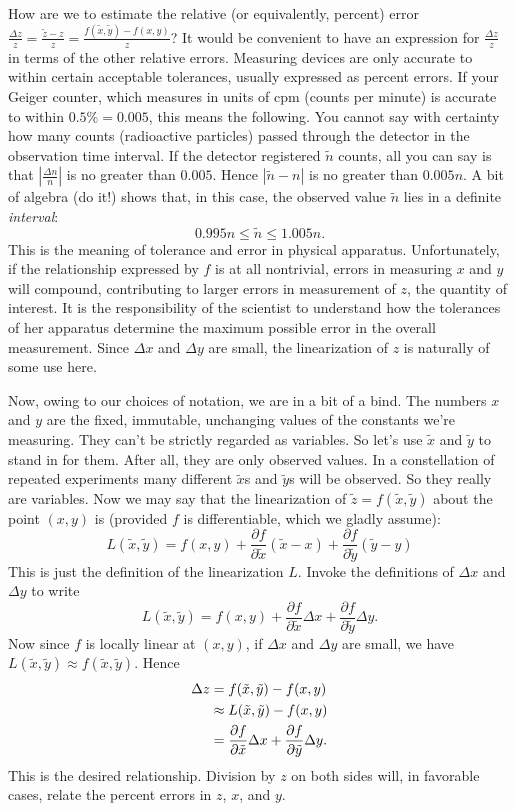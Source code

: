 \documentclass[11pt]{amsart}
\begin{document}
How are we to estimate the relative (or equivalently, percent) error $\frac{\Delta z}{z} = \frac{\tilde{z} - z}{z} = \frac{f(\tilde{x},\tilde{y}) - f(x,y)}{z}$? It would be convenient to have an expression for $\frac{\Delta z}{z}$ in terms of the other relative errors. Measuring devices are only accurate to within certain acceptable tolerances, usually expressed as percent errors. If your Geiger counter, which measures in units of cpm (counts per minute) is accurate to within $0.5\% = 0.005$, this means the following. You cannot say with certainty how many counts (radioactive particles) passed through the detector in the observation time interval. If the detector registered $\tilde{n}$ counts, all you can say is that $\left| \frac{\Delta n}{n} \right|$ is no greater than $0.005$. Hence $\left| \tilde{n} - n \right|$ is no greater than $0.005 n$. A bit of algebra (do it!) shows that, in this case, the observed value $\tilde{n}$ lies in a definite \emph{interval}:
\[
    0.995n \leq \tilde{n} \leq 1.005 n.
\]
This is the meaning of tolerance and error in physical apparatus. Unfortunately, if the relationship expressed by $f$ is at all nontrivial, errors in measuring $x$ and $y$ will compound, contributing to larger errors in measurement of $z$, the quantity of interest. It is the responsibility of the scientist to understand how the tolerances of her apparatus determine the maximum possible error in the overall measurement. Since $\Delta x$ and $\Delta y$ are small, the linearization of $z$ is naturally of some use here.

Now, owing to our choices of notation, we are in a bit of a bind. The numbers $x$ and $y$ are the fixed, immutable, unchanging values of the constants we're measuring. They can't be strictly regarded as variables. So let's use $\tilde{x}$ and $\tilde{y}$ to stand in for them. After all, they are only observed values. In a constellation of repeated experiments many different $\tilde{x}$s and $\tilde{y}$s will be observed. So they really are variables. Now we may say that the linearization of $\tilde{z} = f(\tilde{x},\tilde{y})$ about the point $(x,y)$ is (provided $f$ is differentiable, which we gladly assume):
\[
    L(\tilde{x},\tilde{y}) = f(x,y) + \dfrac{\partial f}{\partial \tilde{x}} (\tilde{x} - x) + \dfrac{\partial f}{\partial \tilde{y}} (\tilde{y} - y)
\]
This is just the definition of the linearization $L$. Invoke the definitions of $\Delta x$ and $\Delta y$ to write
\[
    L(\tilde{x},\tilde{y}) = f(x,y) + \dfrac{\partial f}{\partial \tilde{x}} \Delta x + \dfrac{\partial f}{\partial \tilde{y}} \Delta y.
\]
Now since $f$ is locally linear at $(x,y)$, if $\Delta x$ and $\Delta y$ are small, we have $L(\tilde{x},\tilde{y}) \approx f(\tilde{x},\tilde{y})$. Hence
\begin{align}\label{eq:approx}
\Delta z &= f(\tilde{x},\tilde{y}) - f(x,y) \notag \\
         &\approx L(\tilde{x},\tilde{y}) - f(x,y) \\
         &= \dfrac{\partial f}{\partial \tilde{x}} \Delta x + \dfrac{\partial f}{\partial \tilde{y}} \Delta y. \notag
\end{align}
This is the desired relationship. Division by $z$ on both sides will, in favorable cases, relate the percent errors in $z$, $x$, and $y$.
\end{document}
